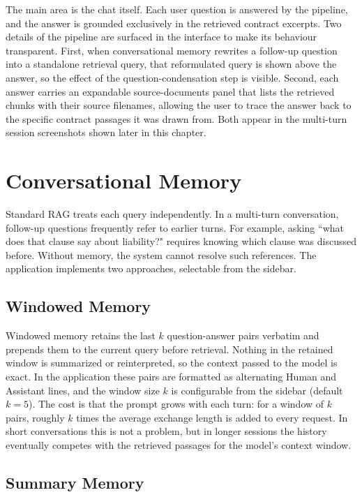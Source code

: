 The main area is the chat itself. Each user question is answered by the pipeline, and the answer is grounded exclusively in the retrieved contract excerpts. Two details of the pipeline are surfaced in the interface to make its behaviour transparent. First, when conversational memory rewrites a follow-up question into a standalone retrieval query, that reformulated query is shown above the answer, so the effect of the question-condensation step is visible. Second, each answer carries an expandable source-documents panel that lists the retrieved chunks with their source filenames, allowing the user to trace the answer back to the specific contract passages it was drawn from. Both appear in the multi-turn session screenshots shown later in this chapter.

\section{Conversational Memory}

Standard RAG treats each query independently. In a multi-turn conversation, follow-up questions frequently refer to earlier turns. For example, asking ``what does that clause say about liability?" requires knowing which clause was discussed before. Without memory, the system cannot resolve such references. The application implements two approaches, selectable from the sidebar.

\subsection{Windowed Memory}

Windowed memory retains the last $k$ question-answer pairs verbatim and prepends them to the current query before retrieval. Nothing in the retained window is summarized or reinterpreted, so the context passed to the model is exact. In the application these pairs are formatted as alternating Human and Assistant lines, and the window size $k$ is configurable from the sidebar (default $k=5$). The cost is that the prompt grows with each turn: for a window of $k$ pairs, roughly $k$ times the average exchange length is added to every request. In short conversations this is not a problem, but in longer sessions the history eventually competes with the retrieved passages for the model's context window.

\subsection{Summary Memory}


